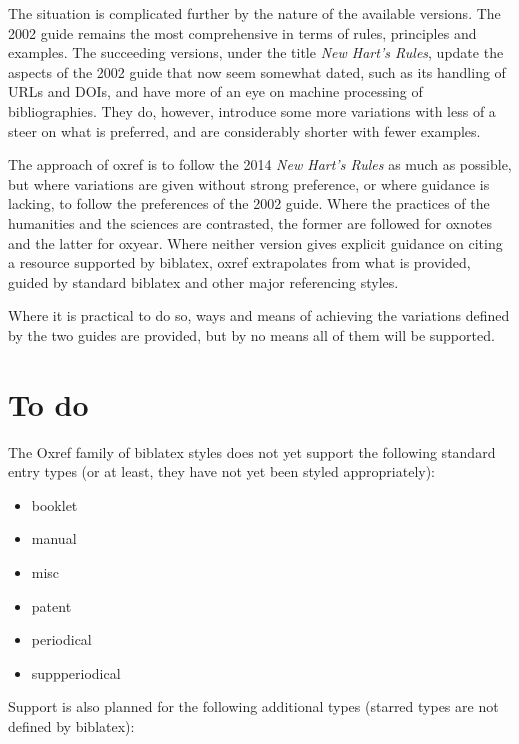 \documentclass[extrafontsizes,11pt,a4paper,oneside]{memoir}
\begin{document}
The situation is complicated further by the nature of the available versions.
The 2002 guide remains the most comprehensive in terms of rules, principles and examples.
The succeeding versions, under the title \emph{New Hart's Rules},
update the aspects of the 2002 guide that now seem somewhat dated,
such as its handling of URLs and DOIs,
and have more of an eye on machine processing of bibliographies.
They do, however, introduce some more variations with less of a steer on what is preferred,
and are considerably shorter with fewer examples.

The approach of \textsf{oxref} is to follow the 2014 \emph{New Hart's Rules} as much as possible,
but where variations are given without strong preference, or where guidance is lacking,
to follow the preferences of the 2002 guide.
Where the practices of the humanities and the sciences are contrasted,
the former are followed for \textsf{oxnotes} and the latter for \textsf{oxyear}.
Where neither version gives explicit guidance on citing a resource supported by \textsf{biblatex},
\textsf{oxref} extrapolates from what is provided, guided by standard \textsf{biblatex}
and other major referencing styles.

Where it is practical to do so,
ways and means of achieving the variations defined by the two guides are provided,
but by no means all of them will be supported.

\section{To do}

The Oxref family of \textsf{biblatex} styles does not yet support the following standard entry types
(or at least, they have not yet been styled appropriately):

\begin{multicols}{2}
  \begin{itemize}\firmlist
    \item booklet
    \item manual
    \item misc
    \item patent
    \item periodical
    \item suppperiodical
  \end{itemize}
\end{multicols}

Support is also planned for the following additional types (starred types are not defined by \textsf{biblatex}):
\end{document}
